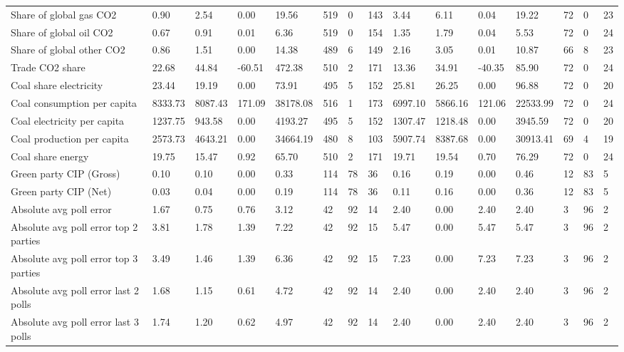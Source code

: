 \begin{longtable}{lllllllllllllll}
Share of global gas CO2 & 0.90 & 2.54 & 0.00 & 19.56 & 519 & 0 & 143 & 3.44 & 6.11 & 0.04 & 19.22 & 72 & 0 & 23\\
Share of global oil CO2 & 0.67 & 0.91 & 0.01 & 6.36 & 519 & 0 & 154 & 1.35 & 1.79 & 0.04 & 5.53 & 72 & 0 & 24\\
Share of global other CO2 & 0.86 & 1.51 & 0.00 & 14.38 & 489 & 6 & 149 & 2.16 & 3.05 & 0.01 & 10.87 & 66 & 8 & 23\\
Trade CO2 share & 22.68 & 44.84 & -60.51 & 472.38 & 510 & 2 & 171 & 13.36 & 34.91 & -40.35 & 85.90 & 72 & 0 & 24\\
Coal share electricity & 23.44 & 19.19 & 0.00 & 73.91 & 495 & 5 & 152 & 25.81 & 26.25 & 0.00 & 96.88 & 72 & 0 & 20\\
\addlinespace
Coal consumption per capita & 8333.73 & 8087.43 & 171.09 & 38178.08 & 516 & 1 & 173 & 6997.10 & 5866.16 & 121.06 & 22533.99 & 72 & 0 & 24\\
Coal electricity per capita & 1237.75 & 943.58 & 0.00 & 4193.27 & 495 & 5 & 152 & 1307.47 & 1218.48 & 0.00 & 3945.59 & 72 & 0 & 20\\
Coal production per capita & 2573.73 & 4643.21 & 0.00 & 34664.19 & 480 & 8 & 103 & 5907.74 & 8387.68 & 0.00 & 30913.41 & 69 & 4 & 19\\
Coal share energy & 19.75 & 15.47 & 0.92 & 65.70 & 510 & 2 & 171 & 19.71 & 19.54 & 0.70 & 76.29 & 72 & 0 & 24\\
Green party CIP (Gross) & 0.10 & 0.10 & 0.00 & 0.33 & 114 & 78 & 36 & 0.16 & 0.19 & 0.00 & 0.46 & 12 & 83 & 5\\
\addlinespace
Green party CIP (Net) & 0.03 & 0.04 & 0.00 & 0.19 & 114 & 78 & 36 & 0.11 & 0.16 & 0.00 & 0.36 & 12 & 83 & 5\\
Absolute avg poll error & 1.67 & 0.75 & 0.76 & 3.12 & 42 & 92 & 14 & 2.40 & 0.00 & 2.40 & 2.40 & 3 & 96 & 2\\
Absolute avg poll error top 2 parties & 3.81 & 1.78 & 1.39 & 7.22 & 42 & 92 & 15 & 5.47 & 0.00 & 5.47 & 5.47 & 3 & 96 & 2\\
Absolute avg poll error top 3 parties & 3.49 & 1.46 & 1.39 & 6.36 & 42 & 92 & 15 & 7.23 & 0.00 & 7.23 & 7.23 & 3 & 96 & 2\\
Absolute avg poll error last 2 polls & 1.68 & 1.15 & 0.61 & 4.72 & 42 & 92 & 14 & 2.40 & 0.00 & 2.40 & 2.40 & 3 & 96 & 2\\
\addlinespace
Absolute avg poll error last 3 polls & 1.74 & 1.20 & 0.62 & 4.97 & 42 & 92 & 14 & 2.40 & 0.00 & 2.40 & 2.40 & 3 & 96 & 2\\

\end{longtable}
